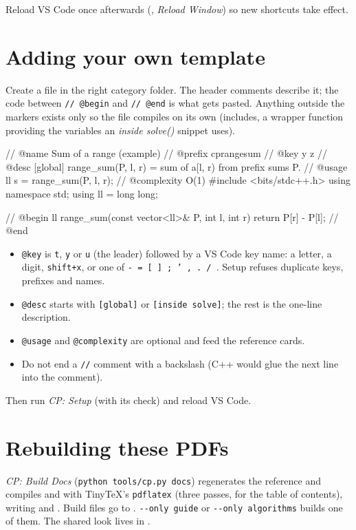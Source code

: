 Reload VS Code once afterwards (, \emph{Reload Window}) so new shortcuts take effect.

\section{Adding your own template}

Create a  file in the right category folder. The header comments describe it; the code between
\texttt{// @begin} and \texttt{// @end} is what gets pasted. Anything outside the markers exists only so the file
compiles on its own (includes, a wrapper function providing the variables an \emph{inside solve()} snippet uses).

\begin{code}
// @name   Sum of a range (example)
// @prefix cprangesum
// @key    y z
// @desc   [global] range_sum(P, l, r) = sum of a[l, r) from prefix sums P.
// @usage  ll s = range_sum(P, l, r);
// @complexity O(1)
#include <bits/stdc++.h>
using namespace std;
using ll = long long;

// @begin
ll range_sum(const vector<ll>& P, int l, int r) { return P[r] - P[l]; }
// @end
\end{code}

\begin{itemize}
  \item \texttt{@key} is \texttt{t}, \texttt{y} or \texttt{u} (the leader) followed by a VS Code key name: a letter, a digit,
        \texttt{shift+x}, or one of \texttt{-~=~[~]~;~'~,~.~/~\textasciigrave}. Setup refuses duplicate keys, prefixes and names.
  \item \texttt{@desc} starts with \texttt{[global]} or \texttt{[inside solve]}; the rest is the one-line description.
  \item \texttt{@usage} and \texttt{@complexity} are optional and feed the reference cards.
  \item Do not end a \texttt{//} comment with a backslash (C++ would glue the next line into the comment).
\end{itemize}

Then run \emph{CP: Setup} (with its check) and reload VS Code.

\section{Rebuilding these PDFs}

\emph{CP: Build Docs} (\texttt{python tools/cp.py docs}) regenerates the reference and compiles
 and  with TinyTeX's \texttt{pdflatex} (three passes, for the table of
contents), writing  and . Build files go to .
\texttt{-{}-only guide} or \texttt{-{}-only algorithms} builds one of them. The shared look lives in
.

